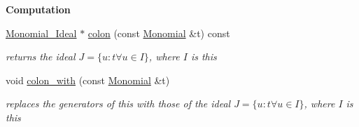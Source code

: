 \begin{Indent}\textbf{ Computation}\par
\begin{DoxyCompactItemize}
\item 
\hyperlink{group__polygroup_class_monomial___ideal}{Monomial\+\_\+\+Ideal} $\ast$ \hyperlink{group__polygroup_a708f7bc64b3e5d5ac3ea8e3b0cb15769}{colon} (const \hyperlink{group__polygroup_class_monomial}{Monomial} \&t) const
\begin{DoxyCompactList}\small\item\em returns the ideal $J=\{u:t \forall u\in I\}$, where $I$ is {\ttfamily this} \end{DoxyCompactList}\item 
void \hyperlink{group__polygroup_a2ae67955874f0a461952a89f6fb25647}{colon\+\_\+with} (const \hyperlink{group__polygroup_class_monomial}{Monomial} \&t)
\begin{DoxyCompactList}\small\item\em replaces the generators of {\ttfamily this} with those of the ideal $J=\{u:t \forall u\in I\}$, where $I$ is {\ttfamily this} \end{DoxyCompactList}\end{DoxyCompactItemize}
\end{Indent}

